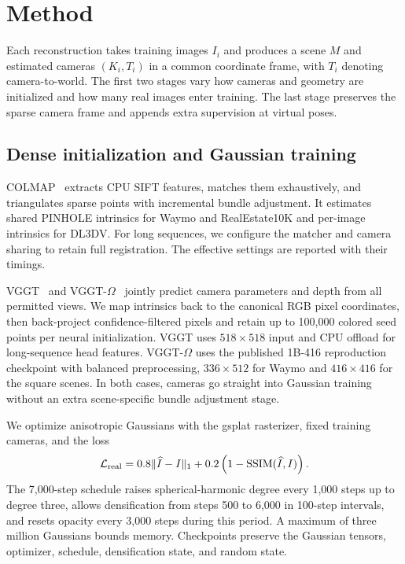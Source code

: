 \section{Method}
\label{sec:method}
Each reconstruction takes training images $I_i$ and produces a scene $M$ and estimated cameras $(K_i,T_i)$ in a common coordinate frame, with $T_i$ denoting camera-to-world. The first two stages vary how cameras and geometry are initialized and how many real images enter training. The last stage preserves the sparse camera frame and appends extra supervision at virtual poses.

\subsection{Dense initialization and Gaussian training}
\label{sec:dense_method}
COLMAP~\cite{schonberger2016sfm} extracts CPU SIFT features, matches them exhaustively, and triangulates sparse points with incremental bundle adjustment. It estimates shared PINHOLE intrinsics for Waymo and RealEstate10K and per-image intrinsics for DL3DV. For long sequences, we configure the matcher and camera sharing to retain full registration. The effective settings are reported with their timings.

VGGT~\cite{wang2025vggt} and VGGT-$\Omega$~\cite{wang2026vggtomega} jointly predict camera parameters and depth from all permitted views. We map intrinsics back to the canonical RGB pixel coordinates, then back-project confidence-filtered pixels and retain up to 100,000 colored seed points per neural initialization. VGGT uses $518\times518$ input and CPU offload for long-sequence head features. VGGT-$\Omega$ uses the published 1B-416 reproduction checkpoint with balanced preprocessing, $336\times512$ for Waymo and $416\times416$ for the square scenes. In both cases, cameras go straight into Gaussian training without an extra scene-specific bundle adjustment stage.

We optimize anisotropic Gaussians with the gsplat rasterizer, fixed training cameras, and the loss
\begin{equation}
  \mathcal L_{\rm real} = 0.8 \lVert \widehat I-I\rVert_1 + 0.2\left(1-\mathrm{SSIM}(\widehat I,I)\right).
  \label{eq:real}
\end{equation}
The 7,000-step schedule raises spherical-harmonic degree every 1,000 steps up to degree three, allows densification from steps 500 to 6,000 in 100-step intervals, and resets opacity every 3,000 steps during this period. A maximum of three million Gaussians bounds memory. Checkpoints preserve the Gaussian tensors, optimizer, schedule, densification state, and random state.

